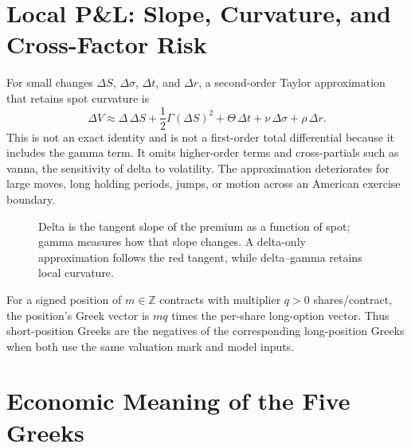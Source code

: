 \documentclass[11pt]{article}
\begin{document}
\section{Local P\&L: Slope, Curvature, and Cross-Factor Risk}

For small changes $\Delta S$, $\Delta\sigma$, $\Delta t$, and $\Delta r$, a second-order Taylor approximation that retains spot curvature is
\begin{equation}
  \label{eq:taylor-pnl}
  \Delta V\approx
  \Delta\,\Delta S
  +\frac12\Gamma(\Delta S)^2
  +\Theta\,\Delta t
  +\nu\,\Delta\sigma
  +\rho\,\Delta r.
\end{equation}
This is not an exact identity and is not a first-order total differential because it includes the gamma term. It omits higher-order terms and cross-partials such as vanna, the sensitivity of delta to volatility. The approximation deteriorates for large moves, long holding periods, jumps, or motion across an American exercise boundary.

\begin{figure}[ht]
  \centering
  \caption{Delta is the tangent slope of the premium as a function of spot; gamma measures how that slope changes. A delta-only approximation follows the red tangent, while delta--gamma retains local curvature.}
  \label{fig:delta-gamma}
\end{figure}

For a signed position of $m\in\mathbb Z$ contracts with multiplier $q>0$ shares/contract, the position's Greek vector is $mq$ times the per-share long-option vector. Thus short-position Greeks are the negatives of the corresponding long-position Greeks when both use the same valuation mark and model inputs.

\section{Economic Meaning of the Five Greeks}
\end{document}
